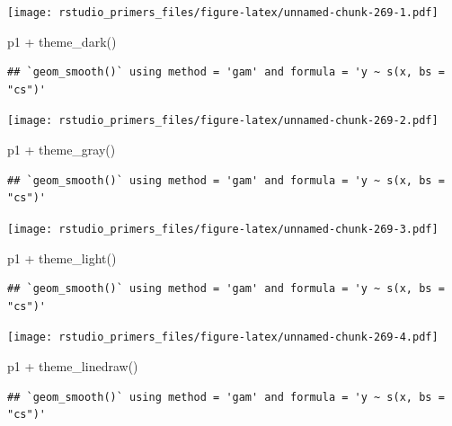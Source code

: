 \documentclass[
]{article}
\newenvironment{Shaded}{\begin{snugshade}}{\end{snugshade}}
\newcommand{\FunctionTok}[1]{\textcolor[rgb]{0.00,0.00,0.00}{#1}}
\newcommand{\NormalTok}[1]{#1}
\newcommand{\SpecialCharTok}[1]{\textcolor[rgb]{0.00,0.00,0.00}{#1}}
\begin{document}
\texttt{[image: rstudio\_primers\_files/figure-latex/unnamed-chunk-269-1.pdf]}

\begin{Shaded}
\begin{Highlighting}[]
\NormalTok{p1 }\SpecialCharTok{+} \FunctionTok{theme\_dark}\NormalTok{()}
\end{Highlighting}
\end{Shaded}

\begin{verbatim}
## `geom_smooth()` using method = 'gam' and formula = 'y ~ s(x, bs = "cs")'
\end{verbatim}

\texttt{[image: rstudio\_primers\_files/figure-latex/unnamed-chunk-269-2.pdf]}

\begin{Shaded}
\begin{Highlighting}[]
\NormalTok{p1 }\SpecialCharTok{+} \FunctionTok{theme\_gray}\NormalTok{()}
\end{Highlighting}
\end{Shaded}

\begin{verbatim}
## `geom_smooth()` using method = 'gam' and formula = 'y ~ s(x, bs = "cs")'
\end{verbatim}

\texttt{[image: rstudio\_primers\_files/figure-latex/unnamed-chunk-269-3.pdf]}

\begin{Shaded}
\begin{Highlighting}[]
\NormalTok{p1 }\SpecialCharTok{+} \FunctionTok{theme\_light}\NormalTok{()}
\end{Highlighting}
\end{Shaded}

\begin{verbatim}
## `geom_smooth()` using method = 'gam' and formula = 'y ~ s(x, bs = "cs")'
\end{verbatim}

\texttt{[image: rstudio\_primers\_files/figure-latex/unnamed-chunk-269-4.pdf]}

\begin{Shaded}
\begin{Highlighting}[]
\NormalTok{p1 }\SpecialCharTok{+} \FunctionTok{theme\_linedraw}\NormalTok{()}
\end{Highlighting}
\end{Shaded}

\begin{verbatim}
## `geom_smooth()` using method = 'gam' and formula = 'y ~ s(x, bs = "cs")'
\end{verbatim}
\end{document}
